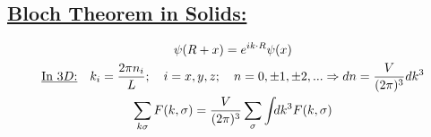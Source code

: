 \subsection*{\underline{Bloch Theorem in Solids:}}
\begin{gather}
    \psi (R+x)=e^{i k\cdot R} \psi (x)\\
    \text{\underline{In $3D$:}}\quad k_i = \frac{2\pi n_i}{L}; \quad i=x, y, z;\quad n=0, \pm1, \pm 2, ... \Rightarrow dn = \frac{V}{(2\pi)^3} dk^3\\
    \sum_{k\sigma}F(k, \sigma)= \frac{V}{(2\pi)^3} \sum_\sigma \int_{}  d k^3 F(k, \sigma)
\end{gather}